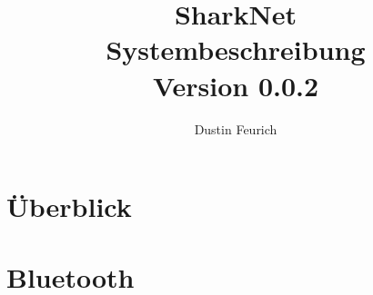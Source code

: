 \documentclass[german]{book}
\begin{document}
	
	

\title{SharkNet\\
Systembeschreibung \\
Version 0.0.2
}

\author{
Dustin Feurich
}

\maketitle

\tableofcontents

\chapter{Überblick}


\chapter{Bluetooth}

\end{document}
